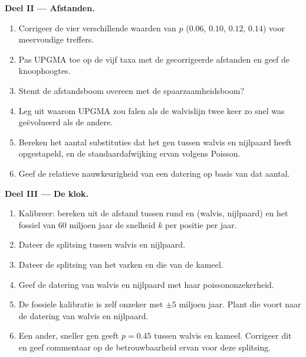\begin{problem}
\medskip
\noindent\textbf{Deel II --- Afstanden.}
\begin{enumerate}[resume]
  \item Corrigeer de vier verschillende waarden van $p$ ($0.06$, $0.10$, $0.12$,
        $0.14$) voor meervoudige treffers.
  \item Pas UPGMA toe op de vijf taxa met de gecorrigeerde afstanden en
        geef de knoophoogtes.
  \item Stemt de afstandsboom overeen met de spaarzaamheidsboom?
  \item Leg uit waarom UPGMA zou falen als de walvislijn twee keer zo snel
        was geëvolueerd als de andere.
  \item Bereken het aantal substituties dat het gen tussen walvis en
        nijlpaard heeft opgestapeld, en de standaardafwijking ervan volgens
        Poisson.
  \item Geef de relatieve nauwkeurigheid van een datering op basis van dat aantal.
\end{enumerate}

\medskip
\noindent\textbf{Deel III --- De klok.}
\begin{enumerate}[resume]
  \item Kalibreer: bereken uit de afstand tussen rund en (walvis, nijlpaard) en
        het fossiel van 60 miljoen jaar de snelheid $k$ per positie per
        jaar.
  \item Dateer de splitsing tussen walvis en nijlpaard.
  \item Dateer de splitsing van het varken en die van de kameel.
  \item Geef de datering van walvis en nijlpaard met haar poissononzekerheid.
  \item De fossiele kalibratie is zelf onzeker met $\pm 5$
        miljoen jaar. Plant die voort naar de datering van walvis en nijlpaard.
  \item Een ander, sneller gen geeft $p = 0.45$ tussen walvis en
        kameel. Corrigeer dit en geef commentaar op de betrouwbaarheid ervan
        voor deze splitsing.
\end{enumerate}


\end{problem}
